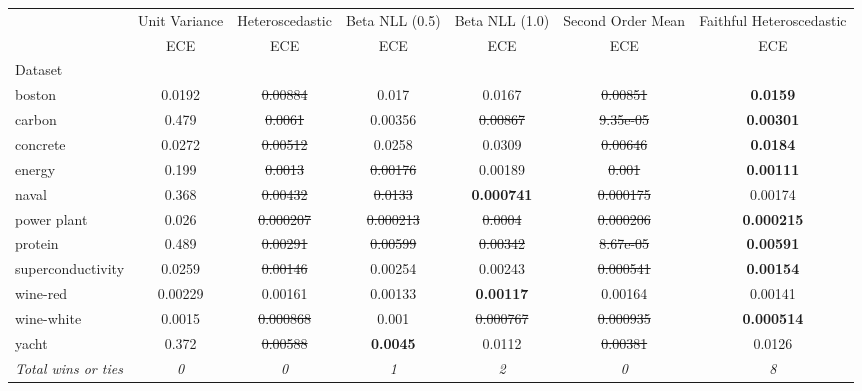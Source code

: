 \begin{tabular}{l|c|c|c|c|c|c}
\toprule
{} & {Unit Variance} & {Heteroscedastic} & {Beta NLL (0.5)} & {Beta NLL (1.0)} & {Second Order Mean} & {Faithful Heteroscedastic} \\
{} & {ECE} & {ECE} & {ECE} & {ECE} & {ECE} & {ECE} \\
{Dataset} & {} & {} & {} & {} & {} & {} \\
\midrule
boston & 0.0192 & \sout{0.00884} & 0.017 & 0.0167 & \sout{0.00851} & \textbf{0.0159} \\
carbon & 0.479 & \sout{0.0061} & 0.00356 & \sout{0.00867} & \sout{9.35e-05} & \textbf{0.00301} \\
concrete & 0.0272 & \sout{0.00512} & 0.0258 & 0.0309 & \sout{0.00646} & \textbf{0.0184} \\
energy & 0.199 & \sout{0.0013} & \sout{0.00176} & 0.00189 & \sout{0.001} & \textbf{0.00111} \\
naval & 0.368 & \sout{0.00432} & \sout{0.0133} & \textbf{0.000741} & \sout{0.000175} & 0.00174 \\
power plant & 0.026 & \sout{0.000207} & \sout{0.000213} & \sout{0.0004} & \sout{0.000206} & \textbf{0.000215} \\
protein & 0.489 & \sout{0.00291} & \sout{0.00599} & \sout{0.00342} & \sout{8.67e-05} & \textbf{0.00591} \\
superconductivity & 0.0259 & \sout{0.00146} & 0.00254 & 0.00243 & \sout{0.000541} & \textbf{0.00154} \\
wine-red & 0.00229 & 0.00161 & 0.00133 & \textbf{0.00117} & 0.00164 & 0.00141 \\
wine-white & 0.0015 & \sout{0.000868} & 0.001 & \sout{0.000767} & \sout{0.000935} & \textbf{0.000514} \\
yacht & 0.372 & \sout{0.00588} & \textbf{0.0045} & 0.0112 & \sout{0.00381} & 0.0126 \\
\textit{{Total wins or ties}} & \textit{0} & \textit{0} & \textit{1} & \textit{2} & \textit{0} & \textit{8} \\
\bottomrule
\end{tabular}
